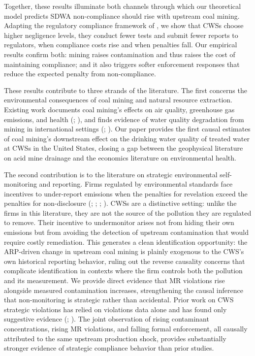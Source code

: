 \documentclass{article}
\begin{document}
Together, these results illuminate both channels through which our theoretical model predicts SDWA non-compliance should rise with upstream coal mining. Adapting the regulatory compliance framework of \cite{kang2021understanding}, we show that CWSs choose higher negligence levels, they conduct fewer tests and submit fewer reports to regulators, when compliance costs rise and when penalties fall. Our empirical results confirm both: mining raises contamination and thus raises the cost of maintaining compliance; and it also triggers softer enforcement responses that reduce the expected penalty from non-compliance.

These results contribute to three strands of the literature. The first concerns the environmental consequences of coal mining and natural resource extraction. Existing work documents coal mining's effects on air quality, greenhouse gas emissions, and health (\cite{muller2011environmental}; \cite{parfitt2024there}), and finds evidence of water quality degradation from mining in international settings (\cite{aragon2016polluting}; \cite{chu2023air}). Our paper provides the first causal estimates of coal mining's downstream effect on the drinking water quality of treated water at CWSs in the United States, closing a gap between the geophysical literature on acid mine drainage and the economics literature on environmental health.

The second contribution is to the literature on strategic environmental self-monitoring and reporting. Firms regulated by environmental standards face incentives to under-report emissions when the penalties for revelation exceed the penalties for non-disclosure (\cite{duflo2013truth}; \cite{duflo2018value}; \cite{mu2024s}; \cite{helland1998enforcement}). CWSs are a distinctive setting: unlike the firms in this literature, they are not the source of the pollution they are regulated to remove. Their incentive to undermonitor arises not from hiding their own emissions but from avoiding the detection of upstream contamination that would require costly remediation. This generates a clean identification opportunity: the ARP-driven change in upstream coal mining is plainly exogenous to the CWS's own historical reporting behavior, ruling out the reverse causality concerns that complicate identification in contexts where the firm controls both the pollution and its measurement. We provide direct evidence that MR violations rise alongside measured contamination increases, strengthening the causal inference that non-monitoring is strategic rather than accidental. Prior work on CWS strategic violations has relied on violations data alone and has found only suggestive evidence (\cite{wallsten2008effects}; \cite{foster2019arsenic}). The joint observation of rising contaminant concentrations, rising MR violations, and falling formal enforcement, all causally attributed to the same upstream production shock, provides substantially stronger evidence of strategic compliance behavior than prior studies.
\end{document}
